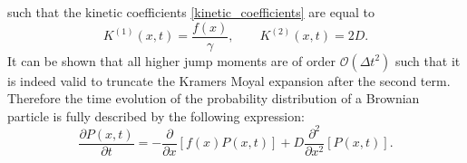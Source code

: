 such that the kinetic coefficients \eqref{kinetic_coefficients} are equal to
\begin{equation}
    \boxed{K^{(1)}(x,t) = \frac{f(x)}{\gamma}, \qquad K^{(2)}(x,t) = 2 D.}
    \label{BD_kinetic_coefficients}
\end{equation}
It can be shown that all higher jump moments are of order $\mathcal{O}(\Delta t ^{2})$ such that it is indeed valid to truncate the Kramers Moyal expansion after the second term. Therefore the time evolution of the probability distribution of a Brownian particle is fully described by the following expression:
\begin{equation}
    \frac{\partial P(x,t)}{\partial t} = - \frac{\partial}{\partial x} \left[f(x)P(x,t) \right] + D\frac{\partial^2}{\partial x^2}\left[P(x,t) \right] .
    \label{FPE2}
\end{equation}

